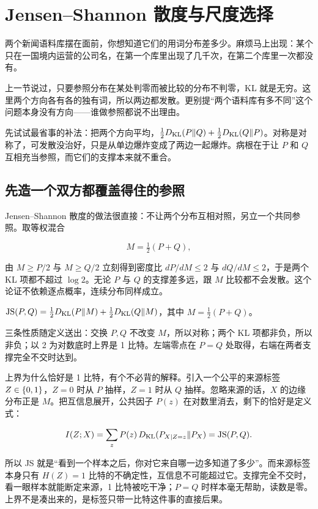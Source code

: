 \section{Jensen--Shannon 散度与尺度选择}
\label{sec:07-Information-Theory/03-Divergences/03}

两个新闻语料库摆在面前，你想知道它们的用词分布差多少。麻烦马上出现：某个只在一国境内运营的公司名，在第一个库里出现了几千次，在第二个库里一次都没有。

上一节说过，只要参照分布在某处判零而被比较的分布不判零，KL 就是无穷。这里两个方向各有各的独有词，所以两边都发散。更别提``两个语料库有多不同''这个问题本身没有方向——谁做参照都说不出理由。

先试试最省事的补法：把两个方向平均，\(\tfrac12D_{\mathrm{KL}}(P\|Q)+\tfrac12D_{\mathrm{KL}}(Q\|P)\)。对称是对称了，可发散没治好，只是从单边爆炸变成了两边一起爆炸。病根在于让 \(P\) 和 \(Q\) 互相充当参照，而它们的支撑本来就不重合。

\subsection{先造一个双方都覆盖得住的参照}

Jensen--Shannon 散度的做法很直接：不让两个分布互相对照，另立一个共同参照。取等权混合

\[
M = \tfrac12 (P + Q),
\]

由 \(M\ge P/2\) 与 \(M\ge Q/2\) 立刻得到密度比 \(dP/dM\le 2\) 与 \(dQ/dM\le 2\)，于是两个 KL 项都不超过 \(\log 2\)。无论 \(P\) 与 \(Q\) 的支撑差多远，跟 \(M\) 比较都不会发散。这个论证不依赖逐点概率，连续分布同样成立。

\begin{definition}
\(\operatorname{JS}(P, Q) = \tfrac12 D_{\mathrm{KL}}(P \| M) + \tfrac12 D_{\mathrm{KL}}(Q \| M)\)，其中 \(M=\tfrac12(P+Q)\)。
\end{definition}

三条性质随定义送出：交换 \(P,Q\) 不改变 \(M\)，所以对称；两个 KL 项都非负，所以非负；以 2 为对数底时上界是 1 比特。左端零点在 \(P=Q\) 处取得，右端在两者支撑完全不交时达到。

上界为什么恰好是 1 比特，有个不必背的解释。引入一个公平的来源标签 \(Z\in\left\{0,1\right\}\)，\(Z=0\) 时从 \(P\) 抽样，\(Z=1\) 时从 \(Q\) 抽样。忽略来源的话，\(X\) 的边缘分布正是 \(M\)。把互信息展开，公共因子 \(P(z)\) 在对数里消去，剩下的恰好是定义式：

\[
I(Z; X)=\sum_z P(z)\,D_{\mathrm{KL}}(P_{X\mid Z=z}\|P_X)=\operatorname{JS}(P,Q).
\]

所以 JS 就是``看到一个样本之后，你对它来自哪一边多知道了多少''。而来源标签本身只有 \(H(Z)=1\) 比特的不确定性，互信息不可能超过它。支撑完全不交时，看一眼样本就能断定来源，1 比特被吃干净；\(P=Q\) 时样本毫无帮助，读数是零。上界不是凑出来的，是标签只带一比特这件事的直接后果。

